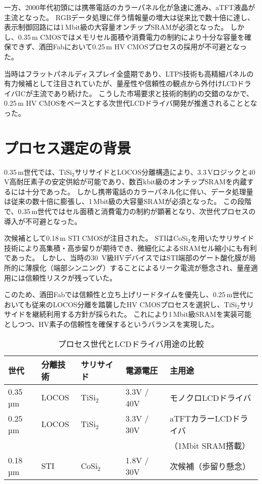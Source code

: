 \documentclass[conference]{IEEEtran}
\begin{document}
一方、2000年代初頭には携帯電話のカラーパネル化が急速に進み、aTFT液晶が主流となった。  
RGBデータ処理に伴う情報量の増大は従来比で数十倍に達し、表示制御回路には1\,Mbit級の大容量オンチップSRAMが必須となった。  
しかし、0.35\,\textmu m CMOSではメモリセル面積や消費電力の制約により十分な容量を確保できず、酒田Fabにおいて0.25\,\textmu m HV CMOSプロセスの採用が不可避となった。  

当時はフラットパネルディスプレイ全盛期であり、LTPS技術も高精細パネルの有力候補として注目されていたが、量産性や信頼性の観点から外付けLCDドライバICが主流であり続けた。  
こうした市場要求と技術的制約の交錯のなかで、0.25\,\textmu m HV CMOSをベースとする次世代LCDドライバ開発が推進されることとなった。

\section{プロセス選定の背景}
0.35\,\textmu m世代では、TiSi$_2$サリサイドとLOCOS分離構造により、3.3\,Vロジックと40\,V高耐圧素子の安定供給が可能であり、数百kbit級のオンチップSRAMを内蔵するには十分であった。  
しかし携帯電話のカラーパネル化に伴い、データ処理量は従来の数十倍に膨張し、1\,Mbit級の大容量SRAMが必須となった。  
この段階で、0.35\,\textmu m世代ではセル面積と消費電力の制約が顕著となり、次世代プロセスの導入が不可避となった。  

次候補として0.18\,\textmu m STI CMOSが注目された。  
STIはCoSi$_2$を用いたサリサイド技術により高集積・高歩留りが期待でき、微細化によるSRAMセル縮小にも有利であった。  
しかし、当時の\SI{30}{V}級HVデバイスではSTI端部のゲート酸化膜が局所的に薄膜化（端部シンニング）することによるリーク電流が懸念され\cite{takeda1994}、量産適用には信頼性リスクが残っていた。  

このため、酒田Fabでは信頼性と立ち上げリードタイムを優先し、0.25\,\textmu m世代においても従来のLOCOS分離を踏襲したHV CMOSプロセスを選択し、TiSi$_2$サリサイドを継続利用する方針が採られた。  
これにより1\,Mbit級SRAMを実装可能としつつ、HV素子の信頼性を確保するというバランスを実現した。

\begin{table}[!t]
\centering
\caption{プロセス世代とLCDドライバ用途の比較}
\label{tab:process_comparison}
\begin{tabularx}{\columnwidth}{l l l l X}
\toprule
世代 & 分離技術 & サリサイド & 電源電圧 & 主用途 \\
\midrule
0.35\,µm & LOCOS & TiSi$_2$ & 3.3V / 40V & モノクロLCDドライバ \\

0.25\,µm & LOCOS & TiSi$_2$ & 3.3V / 30V & aTFTカラーLCDドライバ \\ 
         &       &          &            & （1Mbit SRAM搭載） \\

0.18\,µm & STI   & CoSi$_2$ & 1.8V / 30V & 次候補（歩留り懸念） \\
\bottomrule
\end{tabularx}
\end{table}
\end{document}
